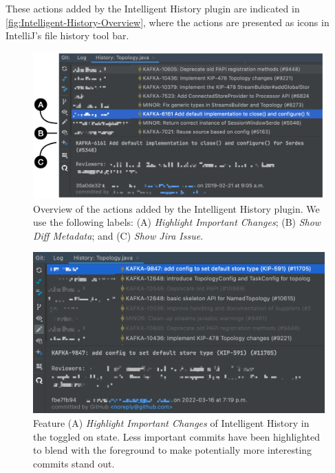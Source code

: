 These actions added by the Intelligent History plugin are indicated in \autoref{fig:Intelligent-History-Overview}, where the actions are presented as icons in IntelliJ's  file history tool bar.

\begin{figure}[h]
    \includegraphics[width=\textwidth]{./images/intelligent-history-overview.png}
    \caption{
        Overview of the actions added by the Intelligent History plugin. We use the following labels: (A) \textit{Highlight Important Changes}; (B) \textit{Show Diff Metadata}; and (C) \textit{Show Jira Issue}.
    }
    \label{fig:Intelligent-History-Overview}
\end{figure}

\begin{figure}[h]
    \includegraphics[width=\textwidth]{./images/intelligent-history-A.png}
    \caption{
        Feature (A) \textit{Highlight Important Changes} of Intelligent History in the toggled on state. Less important commits have been highlighted to blend with the foreground to make potentially more interesting commits stand out.
    }
    \label{fig:Intelligent-History-A}
\end{figure}

